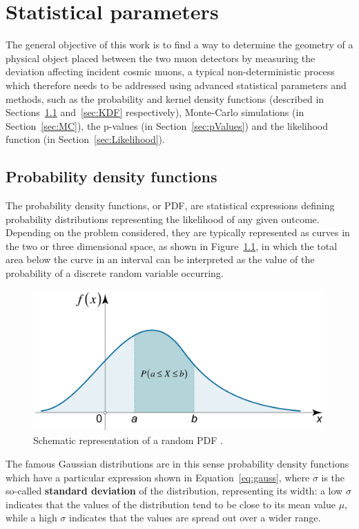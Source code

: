 \documentclass[a4paper, 11pt]{report}
\begin{document}
\chapter{Statistical parameters}

The general objective of this work is to find a way to determine the geometry of a physical object placed between the two muon detectors by measuring the deviation affecting incident cosmic muons, a typical non-deterministic process which therefore needs to be addressed using advanced statistical parameters and methods, such as the probability and kernel density functions (described in Sections~\ref{sec:PDF} and~\ref{sec:KDF} respectively), Monte-Carlo simulations (in Section~\ref{sec:MC}), the p-values (in Section~\ref{sec:pValues}) and the likelihood function (in Section~\ref{sec:Likelihood}).

\section{Probability density functions} \label{sec:PDF}

The probability density functions, or PDF, are statistical expressions defining probability distributions representing the likelihood of any given outcome. Depending on the problem considered, they are typically represented as curves in the two or three dimensional space, as shown in Figure~\ref{fig:PDF}, in which the total area below the curve in an interval can be interpreted as the value of the probability of a discrete random variable occurring. 

\begin{figure}[htbp]
\begin{center}
\includegraphics[width=12cm, height=5.4cm]{figs/PDF.png}
\caption{Schematic representation of a random PDF \cite{PDF}.}
\label{fig:PDF}
\end{center}
\end{figure}

The famous Gaussian distributions are in this sense probability density functions which have a particular expression shown in Equation~\ref{eq:gauss}, where $\sigma$ is the so-called \textbf{standard deviation} of the distribution, representing its width: a low $\sigma$ indicates that the values of the distribution tend to be close to its mean value $\mu$, while a high $\sigma$ indicates that the values are spread out over a wider range.
\end{document}
